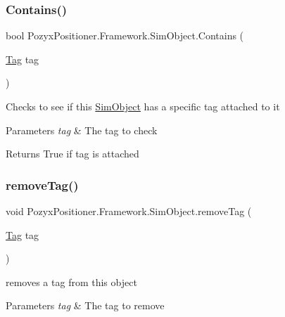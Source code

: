 \subsubsection{\texorpdfstring{Contains()}{Contains()}}
{\footnotesize\ttfamily bool Pozyx\+Positioner.\+Framework.\+Sim\+Object.\+Contains (\begin{DoxyParamCaption}\item[{\hyperlink{class_pozyx_positioner_1_1_framework_1_1_tag}{Tag}}]{tag }\end{DoxyParamCaption})}



Checks to see if this \hyperlink{class_pozyx_positioner_1_1_framework_1_1_sim_object}{Sim\+Object} has a specific tag attached to it 


\begin{DoxyParams}{Parameters}
{\em tag} & The tag to check \\
\hline
\end{DoxyParams}
\begin{DoxyReturn}{Returns}
True if tag is attached 
\end{DoxyReturn}
\mbox{\label{class_pozyx_positioner_1_1_framework_1_1_sim_object_a7cbe138ef2d7a74045a2e706ae3f59b4}} 
\subsubsection{\texorpdfstring{remove\+Tag()}{removeTag()}}
{\footnotesize\ttfamily void Pozyx\+Positioner.\+Framework.\+Sim\+Object.\+remove\+Tag (\begin{DoxyParamCaption}\item[{\hyperlink{class_pozyx_positioner_1_1_framework_1_1_tag}{Tag}}]{tag }\end{DoxyParamCaption})}



removes a tag from this object 


\begin{DoxyParams}{Parameters}
{\em tag} & The tag to remove \\
\hline
\end{DoxyParams}
\mbox{\label{class_pozyx_positioner_1_1_framework_1_1_sim_object_afe392c2a31003ef615127a8c00f6ed27}} 
